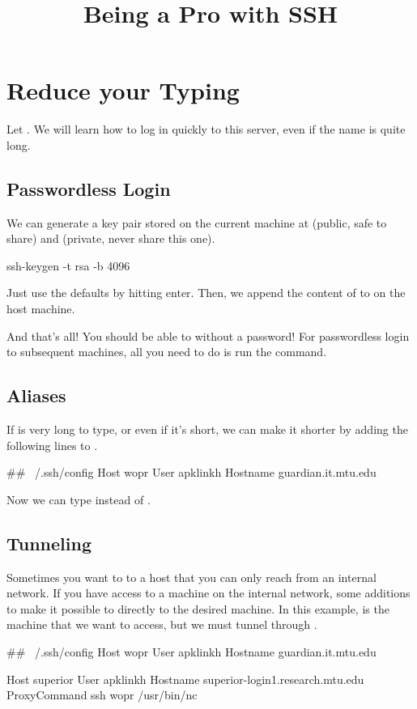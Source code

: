 
\title{Being a Pro with SSH}
\date{}



\tableofcontents

\section{Reduce your Typing}
\label{sec:sanity}

Let .
We will learn how to log in quickly to this server, even if the name is quite long.

\subsection{Passwordless Login}

We can generate a key pair stored on the current machine at  (public, safe to share) and  (private, never share this one).
\begin{code}
ssh-keygen -t rsa -b 4096
\end{code}
Just use the defaults by hitting enter.
Then, we append the content of  to  on the host machine.
And that's all! You should be able to  without a password!
For passwordless login to subsequent machines, all you need to do is run the  command.

\subsection{Aliases}

If  is very long to type, or even if it's short, we can make it shorter by adding the following lines to .
\begin{code}
## ~/.ssh/config
Host wopr
User apklinkh
Hostname guardian.it.mtu.edu
\end{code}
Now we can type  instead of .

\subsection{Tunneling}
Sometimes you want to  to a host that you can only reach from an internal network.
If you have access to a machine on the internal network, some additions to  make it possible to  directly to the desired machine.
In this example,  is the machine that we want to access, but we must tunnel through .
\begin{code}
## ~/.ssh/config
Host wopr
User apklinkh
Hostname guardian.it.mtu.edu

Host superior
User apklinkh
Hostname superior-login1.research.mtu.edu
ProxyCommand ssh wopr /usr/bin/nc %
\end{code}



